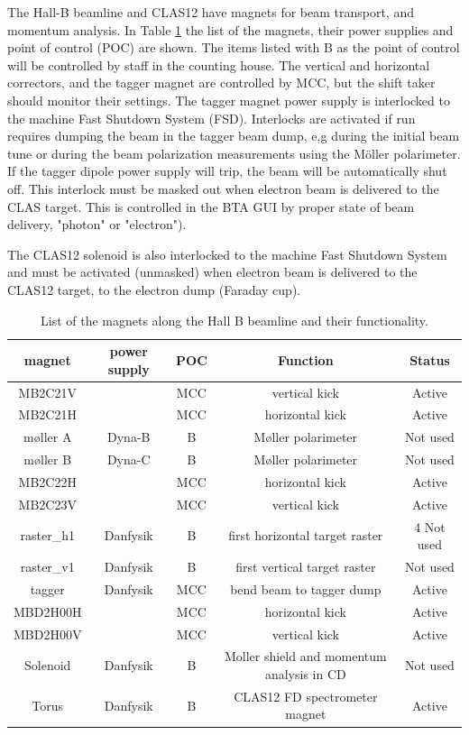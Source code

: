 \documentclass[12pt]{article}
\begin{document}
The Hall-B beamline and CLAS12 have magnets for beam transport, and momentum analysis. In Table \ref{magnets} the list of the magnets, their power supplies and point of control (POC) are shown. The items listed with B
as the point of control will be controlled by staff in the counting
house. The vertical and horizontal correctors, and the tagger magnet are controlled
by MCC, but the shift taker should monitor their settings. The tagger
magnet power supply is interlocked to the machine Fast Shutdown System (FSD). Interlocks are activated if run requires dumping the beam in the tagger beam dump, e,g during the initial beam tune or during the beam polarization measurements using the M{\"o}ller polarimeter. If the tagger
dipole power supply will trip, the beam will be automatically shut off. This interlock must 
be masked out when electron beam is delivered to the CLAS target. This is controlled in the BTA GUI by proper state of beam delivery, "photon" or "electron"). 

The CLAS12 solenoid is also interlocked to the machine Fast Shutdown System and must be activated (unmasked) when  electron beam is delivered to the CLAS12 target, to the electron dump (Faraday cup). 

\begin{table}[tbhp]
\vspace{0.3cm}
{\centering \begin{tabular}{|c|c|c|c|c|}
\hline 
magnet&
power supply&
POC&
Function&
Status\\
\hline 
\hline 
MB2C21V&
&
MCC&
vertical kick&
Active\\
\hline 
MB2C21H&
&
MCC&
horizontal kick&
Active\\
\hline 
m{\o}ller A&
Dyna-B&
B&
M{\o}ller polarimeter&
Not used\\
\hline 
m{\o}ller B&
Dyna-C&
B&
M{\o}ller polarimeter&
Not used\\
\hline 
MB2C22H&
&
MCC&
horizontal kick&
Active\\
\hline 
MB2C23V&
&
MCC&
vertical kick&
Active\\
\hline 
raster\_h1&
Danfysik&
B&
first horizontal target raster&4
Not used\\
\hline 
raster\_v1&
Danfysik&
B&
first vertical target raster&
Not used\\
\hline 
tagger&
Danfysik&
MCC&
bend beam to tagger dump&
Active\\
\hline 
MBD2H00H&
&
MCC&
horizontal kick&
Active\\
\hline 
MBD2H00V&
&
MCC&
vertical kick&
Active\\
\hline 
Solenoid&
Danfysik&
B&
Moller shield and momentum analysis in CD&
Not used\\
\hline 
Torus&
Danfysik&
B&
CLAS12 FD spectrometer magnet&
Active\\
\hline 
\end{tabular}\par}
\vspace{0.3cm}


\caption{List of the magnets along the Hall B beamline and their functionality.\label{magnets}}
\end{table} 
\end{document}
